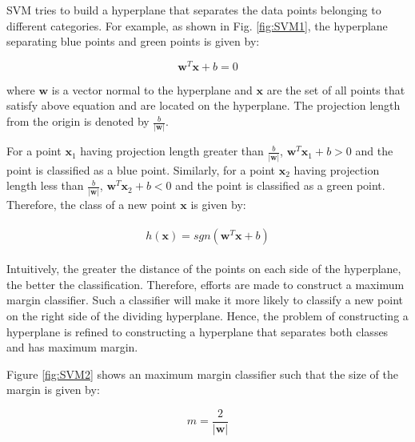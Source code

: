%


SVM tries to build a hyperplane that separates the data points belonging to different categories. For example, as shown in Fig. \ref{fig:SVM1}, the hyperplane separating blue points and green points is given by:

$$
\mathbf{w}^{T}\mathbf{x} + b = 0
$$

where $\mathbf{w}$ is a vector normal to the hyperplane and $\mathbf{x}$ are the set of all points that satisfy above equation and are located on the hyperplane. The projection length from the origin is denoted by $\frac{b}{|\mathbf{w}|}$. 

For a point $\mathbf{x}_1$ having projection length greater than $\frac{b}{|\mathbf{w}|}$, $\mathbf{w}^{T}\mathbf{x}_1 + b > 0$ and the point is classified as a blue point. Similarly, for a point $\mathbf{x}_2$ having projection length less than $\frac{b}{|\mathbf{w}|}$, $\mathbf{w}^{T}\mathbf{x}_2 + b < 0$ and the point is classified as a green point. Therefore, the class of a new point $\mathbf{x}$ is given by:

\begin{align}
\begin{aligned}
h(\mathbf{x}) = sgn(\mathbf{w}^{T}\mathbf{x} + b) \label{eq:sgn}
\end{aligned}
\end{align}

Intuitively, the greater the distance of the points on each side of the hyperplane, the better the classification. Therefore, efforts are made to construct a maximum margin classifier.  Such a classifier will make it more likely to classify a new point on the right side of the dividing hyperplane. Hence, the problem of constructing a hyperplane is refined to constructing a hyperplane that separates both classes and has maximum margin.

Figure \ref{fig:SVM2} shows an maximum margin classifier such that the size of the margin is given by:

$$
m=\frac{2}{|\mathbf{w}|}
$$

